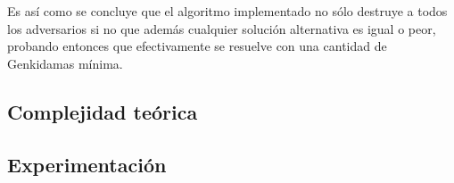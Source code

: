 	Es así como se concluye que el algoritmo implementado no sólo destruye a
	todos los adversarios si no que además cualquier solución alternativa es
	igual o peor, probando entonces que efectivamente se resuelve con una
	cantidad de Genkidamas mínima.

    \subsection{Complejidad teórica}


    \subsection{Experimentación}

